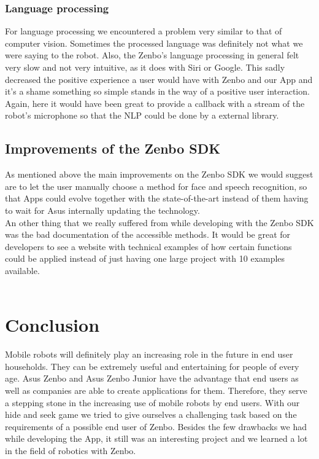 \documentclass[conference]{IEEEtran}
\begin{document}
\subsubsection{Language processing}
For language processing we encountered a problem very similar to that of computer vision. Sometimes the processed language was definitely not 
what we were saying to the robot. Also, the Zenbo's language processing in general felt very slow and not very intuitive, as it does with Siri or Google.
This sadly decreased the positive experience a user would have with Zenbo and our App and it's a shame something so simple stands in the way of a positive user interaction.
Again, here it would have been great to provide a callback with a stream of the robot's microphone so that the NLP could be done by a external library.

\subsection{Improvements of the Zenbo SDK}
As mentioned above the main improvements on the Zenbo SDK we would suggest are to let the user manually choose a method for face and speech recognition, so that Apps could evolve together with the state-of-the-art instead of them having to wait for Asus internally updating the technology.\\
An other thing that we really suffered from while developing with the Zenbo SDK was the bad documentation of the accessible methods.
It would be great for developers to see a website with technical examples of how certain functions could be applied instead of just having one large project with 10 examples available.\\\\
\section{Conclusion}
Mobile robots will definitely play an increasing role in the future in end user households. 
They can be extremely useful and entertaining for people of every age. Asus Zenbo and Asus Zenbo Junior
have the advantage that end users as well as companies are able to create applications for them.
Therefore, they serve a stepping stone in the increasing use of mobile robots by end users.
With our hide and seek game we tried to give ourselves a challenging task based on the requirements of a possible end user of Zenbo.
Besides the few drawbacks we had while developing the App, it still was an interesting project and we learned a lot in the field of robotics
with Zenbo.\\\\ 
\end{document}
